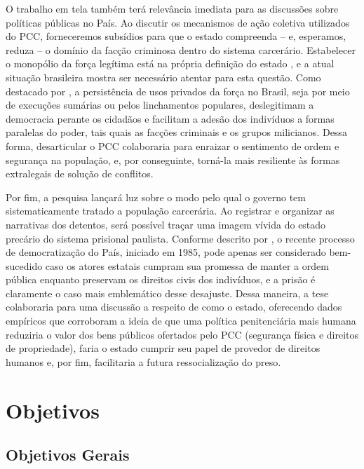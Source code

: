 \documentclass[a4paper,11pt]{article}
\begin{document}
O trabalho em tela também terá relevância imediata para as discussões sobre políticas públicas no País. Ao discutir os mecanismos de ação coletiva utilizados do PCC, forneceremos subsídios para que o estado compreenda -- e, esperamos, reduza -- o domínio da facção criminosa dentro do sistema carcerário. Estabelecer o monopólio da força legítima está na própria definição do estado \citep{weber1919politik}, e a atual situação brasileira mostra ser necessário atentar para esta questão. Como destacado por \citet{adorno2002exclusao}, a persistência de usos privados da força no Brasil, seja por meio de execuções sumárias ou pelos linchamentos populares, deslegitimam a democracia perante os cidadãos e facilitam a adesão dos indivíduos a formas paralelas do poder, tais quais as facções criminais e os grupos milicianos. Dessa forma, desarticular o PCC colaboraria para enraizar o sentimento de ordem e segurança na população, e, por conseguinte, torná-la mais resiliente às formas extralegais de solução de conflitos.

Por fim, a pesquisa lançará luz sobre o modo pelo qual o governo tem sistematicamente tratado a população carcerária. Ao registrar e organizar as narrativas dos detentos, será possível traçar uma imagem vívida do estado precário do sistema prisional paulista. Conforme descrito por \citet[323]{dias2009guerra}, o recente processo de democratização do País, iniciado em 1985, pode apenas ser considerado bem-sucedido caso os atores estatais cumpram sua promessa de manter a ordem pública enquanto preservam os direitos civis dos indivíduos, e a prisão é claramente o caso mais emblemático desse desajuste. Dessa maneira, a tese colaboraria para uma discussão a respeito de como o estado, oferecendo dados empíricos que corroboram a ideia de que uma política penitenciária mais humana reduziria o valor dos bens públicos ofertados pelo PCC (segurança física e direitos de propriedade), faria o estado cumprir seu papel de provedor de direitos humanos e, por fim, facilitaria a futura ressocialização do preso.

\section{Objetivos}

\subsection{Objetivos Gerais}
\end{document}

